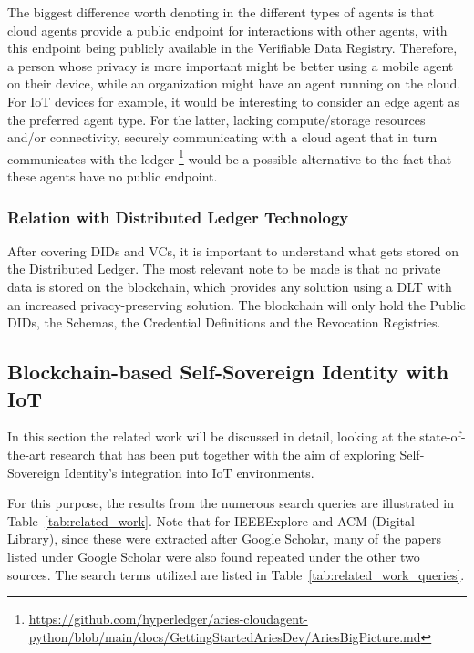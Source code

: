 The biggest difference worth denoting in the different types of agents is that cloud agents provide a public endpoint for interactions with other agents, with this endpoint being publicly available in the Verifiable Data Registry. Therefore, a person whose privacy is more important might be better using a mobile agent on their device, while an organization might have an agent running on the cloud. For IoT devices for example, it would be interesting to consider an edge agent as the preferred agent type. For the latter, lacking compute/storage resources and/or connectivity, securely communicating with a cloud agent that in turn communicates with the ledger \footnote{\url{https://github.com/hyperledger/aries-cloudagent-python/blob/main/docs/GettingStartedAriesDev/AriesBigPicture.md}} would be a possible alternative to the fact that these agents have no public endpoint.

\subsubsection{Relation with Distributed Ledger Technology}
\label{subsec:what_information_goes_onto_the_DLT?}

After covering DIDs and VCs, it is important to understand what gets stored on the Distributed Ledger. The most relevant note to be made is that no private data is stored on the blockchain, which provides any solution using a DLT with an increased privacy-preserving solution. The blockchain will only hold the Public DIDs, the Schemas, the Credential Definitions and the Revocation Registries. 

\subsection{Blockchain-based Self-Sovereign Identity with IoT}
\label{subsubsec:Blockchain-based_SSI_with_IoT}

In this section the related work will be discussed in detail, looking at the state-of-the-art research that has been put together with the aim of exploring Self-Sovereign Identity's integration into IoT environments.

For this purpose, the results from the numerous search queries are illustrated in Table~\ref{tab:related_work}. Note that for IEEEExplore and ACM (Digital Library), since these were extracted after Google Scholar, many of the papers listed under Google Scholar were also found repeated under the other two sources. The search terms utilized are listed in Table~\ref{tab:related_work_queries}.

